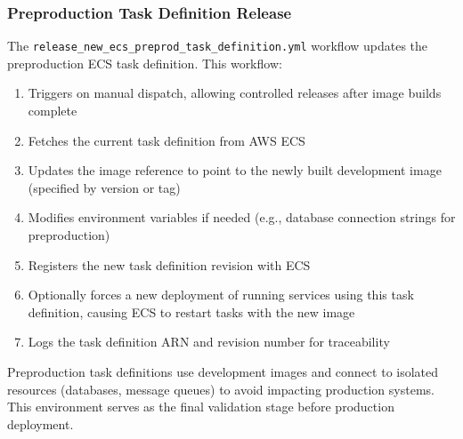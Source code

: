 \subsubsection{Preproduction Task Definition Release}
The \texttt{release\_new\_ecs\_preprod\_task\_definition.yml} workflow
updates the preproduction ECS task definition. This workflow:
\begin{enumerate}
  \item Triggers on manual dispatch, allowing controlled releases
    after image builds complete

  \item Fetches the current task definition from AWS ECS

  \item Updates the image reference to point to the newly built development
    image (specified by version or tag)

  \item Modifies environment variables if needed (e.g., database
    connection strings for preproduction)

  \item Registers the new task definition revision with ECS

  \item Optionally forces a new deployment of running services using this
    task definition, causing ECS to restart tasks with the new image

  \item Logs the task definition ARN and revision number for traceability
\end{enumerate}
Preproduction task definitions use development images and connect to
isolated resources (databases, message queues) to avoid impacting production
systems. This environment serves as the final validation stage before
production deployment.

